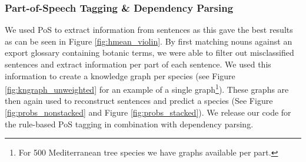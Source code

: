 \documentclass[a4paper, 12pt, oneside]{book} %
\begin{document}
\subsubsection{Part-of-Speech Tagging \& Dependency Parsing}
We used PoS to extract information from sentences as this gave the best results as can be seen in Figure \ref{fig:hmean_violin}.
By first matching nouns against an export glossary containing botanic terms, we were able to filter out misclassified sentences and extract information per part of each sentence.
We used this information to create a knowledge graph per species (see Figure \ref{fig:kngraph_unweighted} for an example of a single graph\footnote{For 500 Mediterranean tree species we have graphs available per part.}). 
These graphs are then again used to reconstruct sentences and predict a species (See Figure \ref{fig:probs_nonstacked} and Figure \ref{fig:probs_stacked}).
We release our code for the rule-based PoS tagging in combination with dependency parsing.
\end{document}
